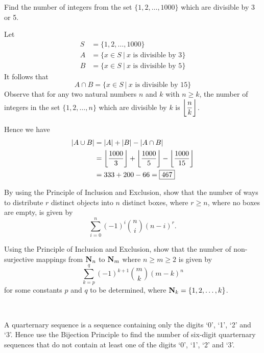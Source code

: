 \begin{exercise}
Find the number of integers from the set $\{1,2,\dots,1000\}$ which are divisible by 3 or 5.
\end{exercise}

\begin{solution}
Let
\begin{align*}
S &= \{1,2,\dots,1000\} \\
A &= \{x\in S\:|\:x\text{ is divisible by 3}\} \\
B &= \{x\in S\:|\:x\text{ is divisible by 5}\}
\end{align*}
It follows that \[ A\cap B = \{x\in S\:|\:x\text{ is divisible by 15}\} \]
Observe that for any two natural numbers $n$ and $k$ with $n\ge k$, the number of integers in the set $\{1,2,\dots,n\}$ which are divisible by $k$ is $\left\lfloor \dfrac{n}{k} \right\rfloor$.

Hence we have 
\begin{align*}
|A\cup B| &= |A| + |B| - |A\cap B| \\
&= \left\lfloor \frac{1000}{3} \right\rfloor + \left\lfloor \frac{1000}{5} \right\rfloor - \left\lfloor \frac{1000}{15} \right\rfloor \\
&= 333 + 200 - 66 = \boxed{467}
\end{align*}
\end{solution}

\begin{exercise}
By using the Principle of Inclusion and Exclusion, show that the number of ways to distribute $r$ distinct objects into $n$ distinct boxes, where $r\ge n$, where no boxes are empty, is given by
\[ \sum_{i=0}^n(-1)^i\binom{n}{i}(n-i)^r. \]
\end{exercise}

\begin{solution}

\end{solution}

\begin{exercise}
Using the Principle of Inclusion and Exclusion, show that the number of non-surjective mappings from $\mathbf N_n$ to $\mathbf N_m$ where $n\ge m\ge2$ is given by
\[\sum_{k=p}^{q}(-1)^{k+1}\binom{m}{k}(m-k)^n\]
for some constants $p$ and $q$ to be determined, where $\mathbf N_k=\{1,2,\dots,k\}$.

\

A quarternary sequence is a sequence containing only the digits `0', `1', `2' and `3'. Hence use the Bijection Principle to find the number of six-digit quarternary sequences that do not contain at least one of the digits `0', `1', `2' and `3'.
\end{exercise}

